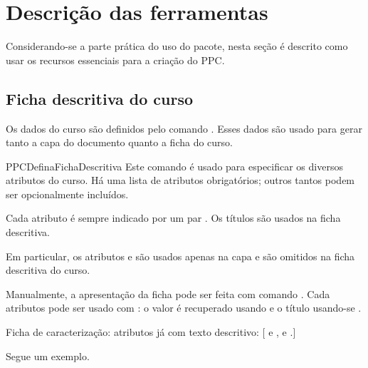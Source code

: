 \documentclass[a4paper, 11pt]{article}
\begin{document}
\section{Descrição das ferramentas}
Considerando-se a parte prática do uso do pacote, nesta seção é descrito como usar os recursos essenciais para a criação do PPC.

\subsection{Ficha descritiva do curso}\label{sec:ficha-descritiva-do-curso}
Os dados do curso são definidos pelo comando . Esses dados são usado para gerar tanto a capa do documento quanto a ficha do curso.

\begin{Macrodef}{PPCDefinaFichaDescritiva}{}{}
    Este comando é usado para especificar os diversos atributos do curso. Há uma lista de atributos obrigatórios; outros tantos podem ser opcionalmente incluídos.

    Cada atributo é sempre indicado por um par . Os títulos são usados na ficha descritiva.
\end{Macrodef}


Em particular, os atributos  e  são usados apenas na capa e são omitidos na ficha descritiva do curso.

Manualmente, a apresentação da ficha pode ser feita com comando . Cada atributos pode ser usado com : o valor é recuperado usando  e o título usando-se .

Ficha de caracterização: atributos já com texto descritivo: [{ e }{, }{ e }{.}]{\mbox{\texttt{\Atributo}}}

Segue um exemplo.
\end{document}
